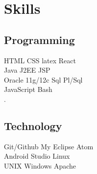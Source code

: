 \documentclass[]{deedy-resume-reversed}
\begin{document}
\begin{minipage}[t]{0.33\textwidth}
\section{Skills}
\subsection{Programming}

 \textbullet{} HTML  \textbullet{}  CSS  \textbullet{} latex \textbullet{}  React \\

 \textbullet{} Java \textbullet{} J2EE \textbullet{} JSP   \\

\textbullet{} Oracle 11g/12c \textbullet{} Sql \textbullet{} Pl/Sql \\

\textbullet{}  JavaScript \textbullet{} Bash    \\
.






\subsection{Technology}
\textbullet{}Git/Github \textbullet{} My Eclipse \textbullet{} Atom \\ \textbullet{} Android Studio \textbullet{} Linux \\
\textbullet{} UNIX \textbullet{} Windows \textbullet{}Apache \\

\sectionsep








\end{minipage}
\end{document}
